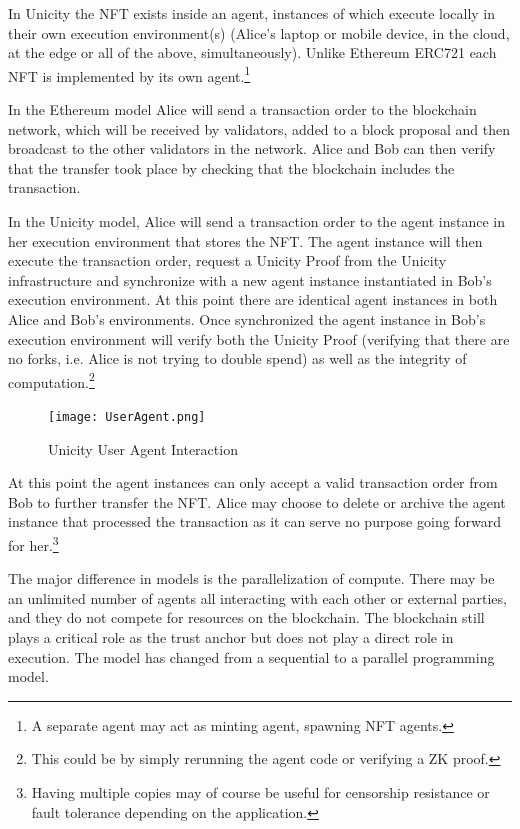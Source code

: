 \documentclass{article}
\begin{document}
In Unicity the NFT exists inside an agent, instances of which execute locally in their own execution environment(s) (Alice's laptop or mobile device, in the cloud, at the edge or all of the above, simultaneously). Unlike Ethereum ERC721 each NFT is implemented by its own agent.\footnote{A separate agent may act as minting agent, spawning NFT agents.}


In the Ethereum model Alice will send a transaction order to the blockchain network, which will be received by validators, added to a block proposal and then broadcast to the other validators in the network. Alice and Bob can then verify that the transfer took place by checking that the blockchain includes the transaction.


In the Unicity model, Alice will send a transaction order to the agent instance in her execution environment that stores the NFT. The agent instance will then execute the transaction order, request a Unicity Proof from the Unicity infrastructure and synchronize with a new agent instance instantiated in Bob's execution environment. At this point there are identical agent instances in both Alice and Bob's environments. Once synchronized the agent instance in Bob's execution environment will verify both the Unicity Proof (verifying that there are no forks, i.e. Alice is not trying to double spend) as well as the integrity of computation.\footnote{This could be by simply rerunning the agent code or verifying a ZK proof.}

\begin{figure}[htbp]
    \centering
    \texttt{[image: UserAgent.png]}
    \caption{Unicity User Agent Interaction}
    \label{fig:UserAgent}
\end{figure}

At this point the agent instances can only accept a valid transaction order from Bob to further transfer the NFT. Alice may choose to delete or archive the agent instance that processed the transaction as it can serve no purpose going forward for her.\footnote{Having multiple copies may of course be useful for censorship resistance or fault tolerance depending on the application.}

The major difference in models is the parallelization of compute. There may be an unlimited number of agents all interacting with each other or external parties, and they do not compete for resources on the blockchain. The blockchain still plays a critical role as the trust anchor but does not play a direct role in execution. The model has changed from a sequential to a parallel programming model.
\end{document}
